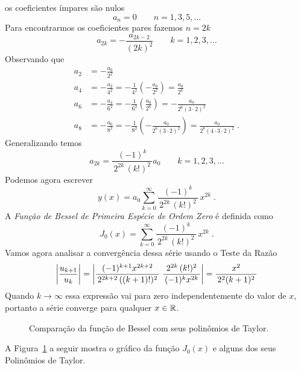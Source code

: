 \begin{example}
  os coeficientes ímpares são nulos
  \[
  a_n = 0 \qquad n = 1, 3, 5, \dots
  \]
  Para encontrarmos os coeficientes pares fazemos $n=2k$
  \[
  a_{2k} = -\frac{a_{2k-2}}{(2k)^2} \qquad k = 1, 2, 3, \dots
  \]
  Observando que
  \begin{align*}
    a_2 & = -\frac{a_0}{2^2} \\[3mm]
    a_4 & = -\frac{a_2}{4^2}
    = -\frac{1}{4^2}\left(-\frac{a_0}{2^2}\right)
    =  \frac{a_0}{2^6} \\[3mm]
    a_6 & = -\frac{a_4}{6^2}
    = -\frac{1}{6^2}\left(\frac{a_0}{2^6}\right)
    = -\frac{a_0}{2^6(3\cdot 2)^2} \\[3mm]
    a_8 & = -\frac{a_6}{8^2}
    = -\frac{1}{8^2}\left(-\frac{a_0}{2^6(3\cdot 2)^2}\right)
    =  \frac{a_0}{2^8(4\cdot 3\cdot 2)^2} \;.
  \end{align*}
  Generalizando temos
  \[
  a_{2k} = \frac{(-1)^k}{\,2^{2k}\,(k!)^2\,} a_0 \qquad k = 1, 2, 3, \dots
  \]
  Podemos agora escrever
  \[
  y(x) = a_0 \sum_{k=0}^\infty \frac{\,(-1)^k\,}{\,2^{2k}\,(k!)^2\,} \, x^{2k} \;.
  \]
  A \emph{Função de Bessel de Primeira Espécie de Ordem Zero} é definida como
  \[
  J_0(x) = \sum_{k=0}^\infty \frac{\,(-1)^k\,}{\,2^{2k}\,(k!)^2\,} \, x^{2k} \;.
  \]
  Vamos agora analisar a convergência dessa série usando o Teste da Razão
  \[
  \abs{\frac{u_{k+1}}{u_k}}
  = \abs{ \frac{\,(-1)^{k+1} x^{2k+2}\,}{\,2^{2k+2}\,((k+1)!)^2\,}\;
    \frac{\,2^{2k}\,(k!)^2\,}{\,(-1)^k x^{2k}\,} }
  = \frac{x^2}{\,2^2 (k+1)^2\,}
  \]
  Quando $k\to\infty$ essa expressão vai para zero independentemente do valor
  de $x$, portanto a série converge para qualquer $x\in\mathbb{R}$.
\end{example}

\begin{figure}
  \begin{center}%
    \vspace{-0.2\baselineskip}%
    \scalebox{0.9}{}%
    \vspace{-\baselineskip}%
  \end{center}
  \caption{Comparação da função de Bessel com seus polinômios de Taylor.}
  \label{fig:funcao_tayplor_bessel}
\end{figure}

A Figura~\ref{fig:funcao_tayplor_bessel} a seguir
mostra o gráfico da função $J_0(x)$ e alguns dos seus Polinômios de Taylor.

